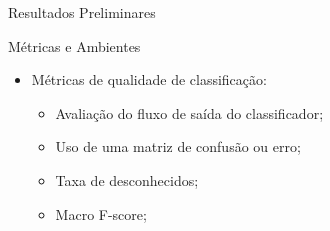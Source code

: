 \documentclass[aspectratio=43,10pt]{beamer}
\begin{document}
\begin{frame}[fragile]{Resultados Preliminares}
  \begin{alertblock}{Métricas e Ambientes}
    \begin{itemize}
      \item Métricas de qualidade de classificação:
      \begin{itemize}
        \item Avaliação do fluxo de saída do classificador;
        \item Uso de uma matriz de confusão ou erro;
        \item Taxa de desconhecidos;
        \item Macro F-score;
      \end{itemize}
    \end{itemize}
  \end{alertblock}


\end{frame}
\end{document}
